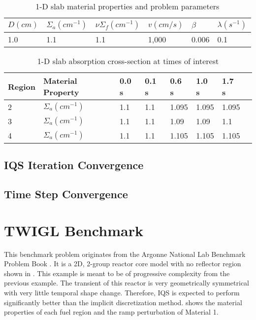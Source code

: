 \begin{table}[!htbp]
\begin{center}
\caption{1-D slab material properties and problem parameters}
\label{tab:1Dmat}
\begin{tabular}{llllll}
\hline
$D (cm)$ & $\Sigma_a (cm^{-1})$ & $\nu \Sigma_f (cm^{-1})$ & $v (cm/s)$ & $\beta$ & $\lambda (s^{-1})$ \\
\hline
1.0 & 1.1 & 1.1 & 1,000 & 0.006 & 0.1 \\

\hline
\end{tabular}
\end{center}
\end{table}

\begin{table}[!htbp]
\begin{center}
\caption{1-D slab absorption cross-section at times of interest}
\label{tab:1Dslope}
\begin{tabular}{llllllll}
\hline
Region & Material Property & 0.0 s & 0.1 s & 0.6 s & 1.0 s & 1.7 s \\
\hline
2 & $\Sigma_{a} (cm^{-1})$ & 1.1 & 1.1 & 1.095 & 1.095 & 1.095 \\
3 & $\Sigma_{a} (cm^{-1})$ & 1.1 & 1.1 & 1.09 & 1.09 & 1.1 \\
4 & $\Sigma_{a} (cm^{-1})$ & 1.1 & 1.1 & 1.105 & 1.105 & 1.105 \\
\hline
\end{tabular}
\end{center}
\end{table}

\subsection{IQS Iteration Convergence}

\subsection{Time Step Convergence}

\pagebreak
\section{TWIGL Benchmark}

This benchmark problem originates from the Argonne National Lab Benchmark Problem Book \cite{ANL_BPB}.  It is a 2D, 2-group reactor core model with no reflector region shown in  \cite{TWIGL_benchmark}.  This example is meant to be of progressive complexity from the previous example.  The transient of this reactor is very geometrically symmetrical with very little temporal shape change.  Therefore, IQS is expected to perform significantly better than the implicit discretization method.   shows the material properties of each fuel region and the ramp perturbation of Material 1.

